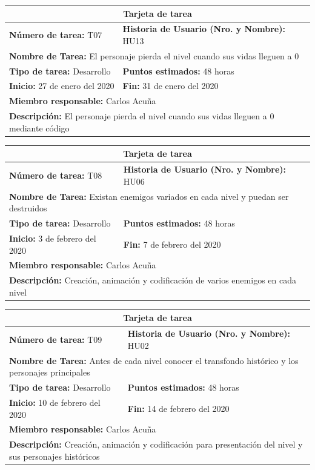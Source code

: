 \documentclass[a4paper, openright, 12pt]{report}
\begin{document}
\begin{longtable}{| p{6cm} | p{6cm} |}
\hline
\multicolumn{2}{|c|}{\textbf{Tarjeta de tarea}} \\
\hline
\textbf{Número de tarea:} T07 & \textbf{Historia de Usuario (Nro. y Nombre):} HU13\\
\hline
\multicolumn{2}{|p{12cm}|}{\textbf{Nombre de Tarea:} El personaje pierda el nivel cuando sus vidas lleguen a 0} \\ \hline
\textbf{Tipo de tarea:} Desarrollo & \textbf{Puntos estimados:} 48 horas  \\ \hline
\textbf{Inicio:} 27 de enero del 2020 & \textbf{Fin:} 31 de enero del 2020 \\ \hline
\multicolumn{2}{|p{12cm}|}{\textbf{Miembro responsable:} Carlos Acuña} \\ \hline
\multicolumn{2}{|p{12cm}|}{\textbf{Descripción:} El personaje pierda el nivel cuando sus vidas lleguen a 0 mediante código} \\ \hline
\end{longtable}
\clearpage
\begin{longtable}{| p{6cm} | p{6cm} |}
\hline
\multicolumn{2}{|c|}{\textbf{Tarjeta de tarea}} \\
\hline
\textbf{Número de tarea:} T08 & \textbf{Historia de Usuario (Nro. y Nombre):} HU06\\
\hline
\multicolumn{2}{|p{12cm}|}{\textbf{Nombre de Tarea:} Existan enemigos variados
en cada nivel y puedan ser destruidos} \\ \hline
\textbf{Tipo de tarea:} Desarrollo & \textbf{Puntos estimados:} 48 horas  \\ \hline
\textbf{Inicio:} 3 de febrero del 2020 & \textbf{Fin:} 7 de febrero del 2020 \\ \hline
\multicolumn{2}{|p{12cm}|}{\textbf{Miembro responsable:} Carlos Acuña} \\ \hline
\multicolumn{2}{|p{12cm}|}{\textbf{Descripción:} Creación, animación y codificación de varios enemigos en cada nivel} \\ \hline
\end{longtable}

\begin{longtable}{| p{6cm} | p{6cm} |}
\hline
\multicolumn{2}{|c|}{\textbf{Tarjeta de tarea}} \\
\hline
\textbf{Número de tarea:} T09 & \textbf{Historia de Usuario (Nro. y Nombre):} HU02\\
\hline
\multicolumn{2}{|p{12cm}|}{\textbf{Nombre de Tarea:} Antes de cada nivel conocer
el transfondo histórico y los personajes principales} \\ \hline
\textbf{Tipo de tarea:} Desarrollo & \textbf{Puntos estimados:} 48 horas  \\ \hline
\textbf{Inicio:} 10 de febrero del 2020 & \textbf{Fin:} 14 de febrero del 2020 \\ \hline
\multicolumn{2}{|p{12cm}|}{\textbf{Miembro responsable:} Carlos Acuña} \\ \hline
\multicolumn{2}{|p{12cm}|}{\textbf{Descripción:} Creación, animación y codificación para presentación del nivel y sus personajes históricos} \\ \hline
\end{longtable}
\end{document}
